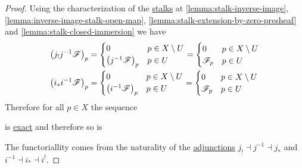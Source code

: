 \documentclass[../../main]{subfiles}
\begin{document}
\begin{proof}
  Using the characterization of the \hyperref[def:stalk]{stalks} at \autoref{lemma:stalk-inverse-image}, \autoref{lemma:inverse-image-stalk-open-map}, \autoref{lemma:stalk-extension-by-zero-presheaf} and \autoref{lemma:stalk-closed-immersion} we have
  \begin{align*}
    \left( j_{!}j^{-1}\mathscr{F} \right)_{p} &= \begin{cases}
      0 & p \in X \setminus U \\
      \left( j^{-1}\mathscr{F} \right)_{p} & p \in U
    \end{cases} = \begin{cases}
      0 & p \in X \setminus U \\
      \mathscr{F}_{p} & p \in U
    \end{cases} \\
    \left( i_{\ast}i^{-1}\mathscr{F} \right)_{p} &= \begin{cases}
      0 & p \in X \setminus U \\
      \left( i^{-1}\mathscr{F} \right)_{p} & p \in U
    \end{cases} = \begin{cases}
      0 & p \in X \setminus U \\
      \mathscr{F}_{p} & p \in U
    \end{cases}
  \end{align*}
  Therefore for all \(p \in X\) the sequence
  \begin{center}
  \end{center}
  is \hyperref[def:exact-sequence]{exact} and therefore so is
  \begin{center}
  \end{center}
  The functoriallity comes from the naturality of the \hyperref[def:adjoint-functors]{adjunctions} \hyperref[thm:open-immersion-adjunction-sheaf]{\(j_{!} \dashv j^{-1} \dashv j_{\ast}\)} and \hyperref[thm:closed-immersion-adjunction]{\(i^{-1} \dashv i_{\ast} \dashv i^{!}\)}.
\end{proof}
\end{document}
